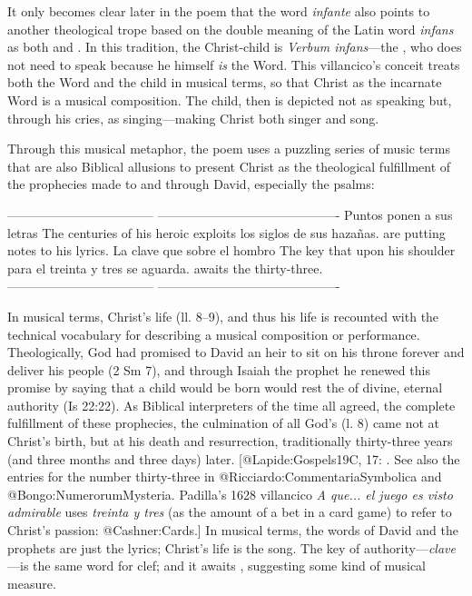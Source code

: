 It only becomes clear later in the poem that the word \emph{infante} also points to
another theological trope based on the double meaning of the Latin word \emph{infans}
as both  and .
In this tradition, the Christ-child is \emph{Verbum infans}---the ,
who does not need to speak because he himself \emph{is} the Word.
This villancico's conceit treats both the Word and the child in musical terms,
so that Christ as the incarnate Word is a musical composition.
The child, then is depicted not as speaking but, through his cries, as
singing---making Christ both singer and song.

Through this musical metaphor, the poem uses a puzzling series of music terms
that are also Biblical allusions to present Christ as the theological
fulfillment of the prophecies made to and through David, especially the psalms:

----------------------------------- -------------------------------------------
Puntos ponen a sus letras           The centuries of his heroic exploits
los siglos de sus hazañas.          are putting notes to his lyrics.
La clave que sobre el hombro        The key that upon his shoulder
para el treinta y tres se aguarda.  awaits the thirty-three.
----------------------------------- -------------------------------------------

\noindent
In musical terms, Christ's life  (ll. 8--9), and
thus his life is recounted with the technical vocabulary for describing a
musical composition or performance.
Theologically, God had promised to David an heir to sit on his throne forever
and deliver his people (2 Sm 7), and through Isaiah the prophet he renewed
this promise by saying that a child would be born  would
rest the  of divine, eternal authority (Is 22:22).
As Biblical interpreters of the time all agreed, the complete fulfillment of
these prophecies, the culmination of all God's 
(l. 8) came not at Christ's birth, but at his death and resurrection,
traditionally thirty-three years (and three months and three days) later.
[@Lapide:Gospels19C, 17: .
See also the entries for the number thirty-three in
@Ricciardo:CommentariaSymbolica and @Bongo:NumerorumMysteria.
Padilla's 1628 villancico \emph{A que... el juego es visto admirable} uses
\emph{treinta y tres} (as the amount of a bet in a card game) to refer to Christ's passion:
@Cashner:Cards.]
In musical terms, the words of David and the prophets are just the lyrics;
Christ's life is the song.
The key of authority---\emph{clave}---is the same word for clef; and it
awaits , suggesting some kind of musical measure.

